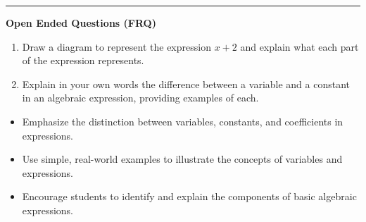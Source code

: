 \documentclass[10pt]{article}
\begin{document}
\vspace{-0.2cm}
\hrule
\vspace{0.2cm}
\textbf{\small Open Ended Questions (FRQ)}
\begin{enumerate}[label=\textbf{Q\arabic*.}, start=9, itemsep=5pt, topsep=0pt]

  \item \small Draw a diagram to represent the expression $x + 2$ and explain what each part of the expression represents. \vspace{2cm}

  \item \small Explain in your own words the difference between a variable and a constant in an algebraic expression, providing examples of each. \vspace{2cm}

\end{enumerate}

\vfill

\begin{tcolorbox}[colback=blue!5, colframe=mainblue!50, title=\small \textbf{Chef's Tips}, fonttitle=\bfseries, bottom=1mm]
\begin{itemize}[noitemsep, topsep=2pt, leftmargin=0.5cm]
  \item \scriptsize Emphasize the distinction between variables, constants, and coefficients in expressions.\item \scriptsize Use simple, real-world examples to illustrate the concepts of variables and expressions.\item \scriptsize Encourage students to identify and explain the components of basic algebraic expressions.
\end{itemize}
\end{tcolorbox}
\end{document}
